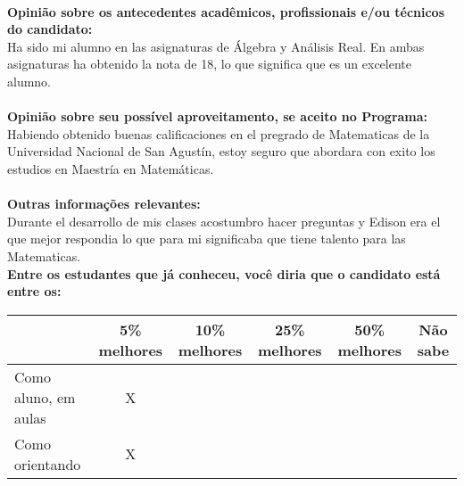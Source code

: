 \documentclass[11pt]{article}
\begin{document}
\\
\textbf{Opinião sobre os antecedentes acadêmicos, profissionais e/ou técnicos do candidato:}
\\Ha sido mi alumno en las asignaturas de Álgebra y Análisis Real.
En ambas asignaturas ha obtenido la nota de 18, lo que significa que es un excelente alumno.\\
\\
\textbf{Opinião sobre seu possível aproveitamento, se aceito no Programa:}
\\Habiendo obtenido buenas calificaciones en el pregrado de Matematicas de la Universidad Nacional de San Agustín, estoy seguro que abordara con exito los estudios en Maestría en Matemáticas.\\ 
\\
\textbf{Outras informações relevantes:} \\Durante el desarrollo de mis clases acostumbro hacer preguntas y Edison era el que mejor respondia lo que para mi significaba que tiene talento para las Matematicas.
\\[0.3cm]
\textbf{Entre os estudantes que já conheceu, você diria que o candidato está entre os:}
\\
\begin{tabular}{|l|c|c|c|c|c|}
\hline
 & 5\% melhores & 10\% melhores & 25\% melhores & 50\% melhores & Não sabe \\
\hline
Como aluno, em aulas & X &  &  &  & \\
\hline
Como orientando & X &  &  &  & \\
\hline
\end{tabular}
\end{document}

